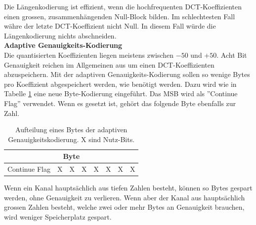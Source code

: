 Die Längenkodierung ist effizient, wenn die hochfrequenten DCT-Koeffizienten einen grossen, zusammenhängenden Null-Block bilden. Im schlechtesten Fall währe der letzte DCT-Koeffizient nicht Null. In diesem Fall würde die Längenkodierung nichts abschneiden.\\

\textbf{Adaptive Genauigkeits-Kodierung}\\
Die quantisierten Koeffizienten liegen meistens zwischen $-50$ und $+50$. Acht Bit Genauigkeit reichen im Allgemeinen aus um einen DCT-Koeffizienten abzuspeichern. Mit der adaptiven Genauigkeits-Kodierung sollen so wenige Bytes pro Koeffizient abgespeichert werden, wie benötigt werden. Dazu wird wie in Tabelle \ref{konzept:loesung1:entropie:adaptive} eine neue Byte-Kodierung eingeführt. Das MSB wird als ''Continue Flag'' verwendet. Wenn es gesetzt ist, gehört das folgende Byte ebenfalls zur Zahl.

\begin{table}[!htbp]
	\center
	\begin{tabular}{|c|c|c|c||c|c|c|c|}
	\hline
	\multicolumn{8}{|c|}{Byte}\\\hline
	Continue Flag & X & X & X & X & X & X & X \\\hline
	\end{tabular}
	\caption{Aufteilung eines Bytes der adaptiven Genauigkeitskodierung. X sind Nutz-Bits.}
	\label{konzept:loesung1:entropie:adaptive}
\end{table}
Wenn ein Kanal hauptsächlich aus tiefen Zahlen besteht, können so Bytes gespart werden, ohne Genauigkeit zu verlieren. Wenn aber der Kanal aus hauptsächlich grossen Zahlen besteht, welche zwei oder mehr Bytes an Genauigkeit brauchen, wird weniger Speicherplatz gespart.

\pagebreak

